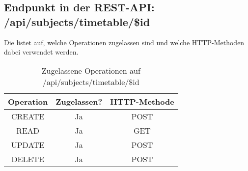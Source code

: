 \subsection{Endpunkt in der REST-API: /api/subjects/timetable/\$id}
Die  listet auf, welche Operationen zugelassen sind und welche HTTP-Methoden dabei verwendet werden. 

\begin{table}[!htbp]
	\begin{tabular}{|c|c|c|}
		\hline
			\textbf{Operation} & \textbf{Zugelassen?} & \textbf{HTTP-Methode} \\ \hline
			CREATE & Ja & POST \\ \hline 
			READ & Ja & GET \\ \hline
			UPDATE & Ja & POST \\ \hline 
			DELETE & Ja & POST \\ \hline
	\end{tabular}

		\caption{Zugelassene Operationen auf /api/subjects/timetable/\$id}
		\label{tab:end:rest:api:subjects:timetable:id:meth}
\end{table}